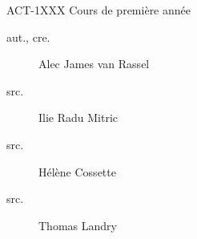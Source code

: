 \begin{contrib}{ACT-1XXX\: Cours de première année}
\begin{description}
	\item[aut., cre.] Alec James van Rassel
	\item[src.]	Ilie Radu Mitric
	\item[src.]	Hélène Cossette
	\item[src.]	Thomas Landry
\end{description}
\end{contrib}